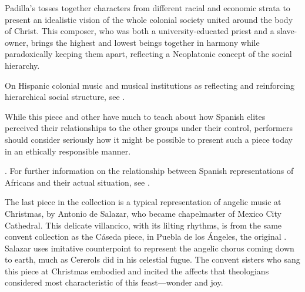 Padilla's  tosses together characters from different 
racial and economic strata to present an idealistic vision of the whole 
colonial society united around the body of Christ.
This composer, who was both a university-educated priest and a slave-owner,%
    \Autocite{Mauleon:PadillaPalafox}
brings the highest and lowest beings together in harmony while paradoxically
keeping them apart, reflecting a Neoplatonic concept of the social hierarchy.%
\begin{Footnote}
    On Hispanic colonial music and musical institutions as reflecting and
    reinforcing hierarchical social structure, see
    \Autocites{Baker:Harmony}{Irving:Colonial}
    {Illari:Popular}{RamosKittrell:PlayingCathedral}.
\end{Footnote}
While this piece and other  have much to teach 
about how Spanish elites perceived their relationships to the other groups 
under their control, performers should consider seriously how it might be 
possible to present such a piece today in an ethically responsible manner.%
  \begin{Footnote}
      \Autocites{Baker:EthnicVC}{Baker:PerformancePostColonial}. 
      For further information on the relationship between Spanish
      representations of Africans and their actual situation, see
      \autocites{Fromont:DancingKingCongo}{Molinero:Negros}.
  \end{Footnote}

The last piece in the collection is a typical representation of angelic music 
at Christmas, by Antonio de Salazar, who became chapelmaster of Mexico City 
Cathedral.%
    \Autocite[29--34]{Cashner:PhD}
This delicate villancico, with its lilting rhythms, is from the same convent 
collection as the Cáseda piece, in Puebla de los Ángeles, the original
.  
Salazar uses imitative counterpoint to represent the angelic chorus coming down 
to earth, much as Cererols did in his celestial fugue. 
The convent sisters who sang this piece at Christmas embodied and incited the 
affects that theologians considered most characteristic of this feast---wonder
and joy.


